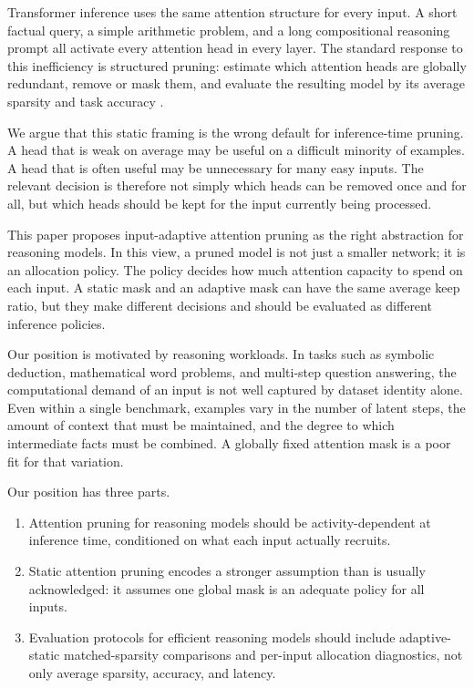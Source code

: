 \documentclass{article}
\begin{document}
Transformer inference uses the same attention structure for every input. A
short factual query, a simple arithmetic problem, and a long compositional
reasoning prompt all activate every attention head in every layer. The standard
response to this inefficiency is structured pruning: estimate which attention
heads are globally redundant, remove or mask them, and evaluate the resulting
model by its average sparsity and task accuracy
\citep{michel2019sixteen,voita2019analyzing,clark2019does}.

We argue that this static framing is the wrong default for inference-time
pruning. A head that is weak on average may be useful on a difficult minority
of examples. A head that is often useful may be unnecessary for many easy
inputs. The relevant decision is therefore not simply which heads can be
removed once and for all, but which heads should be kept for the input currently
being processed.

This paper proposes input-adaptive attention pruning as the right abstraction
for reasoning models. In this view, a pruned model is not just a smaller
network; it is an allocation policy. The policy decides how much attention
capacity to spend on each input. A static mask and an adaptive mask can have
the same average keep ratio, but they make different decisions and should be
evaluated as different inference policies.

Our position is motivated by reasoning workloads. In tasks such as symbolic
deduction, mathematical word problems, and multi-step question answering, the
computational demand of an input is not well captured by dataset identity alone.
Even within a single benchmark, examples vary in the number of latent steps,
the amount of context that must be maintained, and the degree to which
intermediate facts must be combined. A globally fixed attention mask is a poor
fit for that variation.

Our position has three parts.

\begin{enumerate}
  \item Attention pruning for reasoning models should be activity-dependent at
        inference time, conditioned on what each input actually recruits.
  \item Static attention pruning encodes a stronger assumption than is usually
        acknowledged: it assumes one global mask is an adequate policy for all
        inputs.
  \item Evaluation protocols for efficient reasoning models should include
        adaptive-static matched-sparsity comparisons and per-input allocation
        diagnostics, not only average sparsity, accuracy, and latency.
\end{enumerate}
\end{document}
